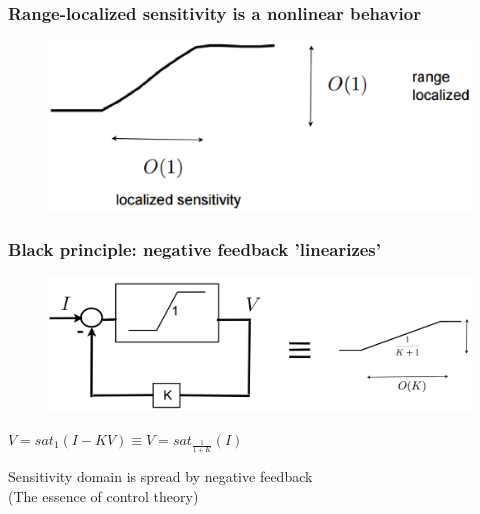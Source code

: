 \documentclass{beamer}
\begin{document}
\begin{frame}
\frametitle{Range-localized sensitivity is a nonlinear behavior}
\begin{figure}
\includegraphics[width=1\linewidth]{range_localization}
\end{figure}
\end{frame}


\begin{frame}
\frametitle{Black principle: negative feedback 'linearizes'}
\begin{figure}
\includegraphics[width=1\linewidth]{black_negative}
\end{figure}
\begin{center}
$V = sat_{1}(I - KV) \equiv V = sat_{\frac{1}{1+K}}(I)$\\
\end{center}
\medskip
Sensitivity domain is spread by negative feedback\\
(The essence of control theory)
\end{frame}

\end{document}
